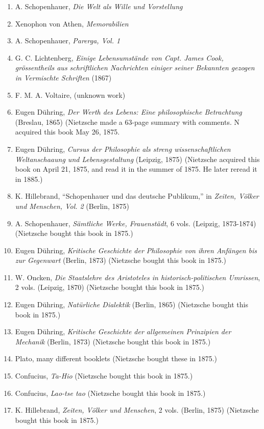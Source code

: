 \begin{enumerate}
    \item A. Schopenhauer, \textit{Die Welt als Wille und Vorstellung}
    \item Xenophon von Athen, \textit{Memorabilien}
    \item A. Schopenhauer, \textit{Parerga, Vol. 1}
    \item G. C. Lichtenberg, \textit{Einige Lebensumstände von Capt. James Cook, grössentheils aus schriftlichen Nachrichten einiger seiner Bekannten gezogen in Vermischte Schriften} (1867)
    \item F. M. A. Voltaire, (unknown work)
    \item Eugen Dühring, \textit{Der Werth des Lebens: Eine philosophische Betrachtung} (Breslau, 1865) (Nietzsche made a 63-page summary with comments.
    N acquired this book May 26, 1875.
    \item Eugen Dühring, \textit{Cursus der Philosophie als streng wissenschaftlichen Weltanschaaung und Lebensgestaltung} (Leipzig, 1875) (Nietzsche acquired this book on April 21, 1875, and read it in the summer of 1875. He later reread it in 1885.)
    \item K. Hillebrand, ``Schopenhauer und das deutsche Publikum,'' in \textit{Zeiten, Völker und Menschen, Vol. 2} (Berlin, 1875)
    \item A. Schopenhauer, \textit{Sämtliche Werke, Frauenstädt}, 6 vols. (Leipzig, 1873-1874) (Nietzsche bought this book in 1875.)
    \item Eugen Dühring, \textit{Kritische Geschichte der Philosophie von ihren Anfängen bis zur Gegenwart} (Berlin, 1873) (Nietzsche bought this book in 1875.)
    \item W. Oncken, \textit{Die Staatslehre des Aristoteles in historisch-politischen Umrissen}, 2 vols.	(Leipzig, 1870) (Nietzsche bought this book in 1875.)
    \item Eugen Dühring, \textit{Natürliche Dialektik} (Berlin, 1865) (Nietzsche bought this book in 1875.)
    \item Eugen Dühring, \textit{Kritische Geschichte der allgemeinen Prinzipien der Mechanik} (Berlin, 1873) (Nietzsche bought this book in 1875.)
    \item Plato, many different booklets (Nietzsche bought these in 1875.)
    \item Confucius, \textit{Ta-Hio} (Nietzsche bought this book in 1875.)
    \item Confucius, \textit{Lao-tse tao} (Nietzsche bought this book in 1875.)
    \item K. Hillebrand, \textit{Zeiten, Völker und Menschen}, 2 vols. (Berlin, 1875) (Nietzsche bought this book in 1875.)

\end{enumerate}
